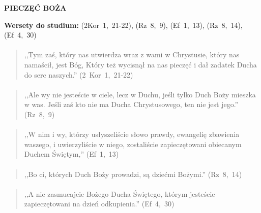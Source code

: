 \documentclass[10pt,a4paper,oneside]{article}
\begin{document}
\centerline{\textbf{\MakeUppercase{Pieczęć Boża}}}
\begin{center}
\textbf{Wersety do studium:} 
\mbox{(2Kor 1, 21-22)}, \mbox{(Rz 8, 9)}, \mbox{(Ef 1, 13)}, \mbox{(Rz 8, 14)}, \mbox{(Ef 4, 30)}
\end{center}
\paragraph{}
\begin{quote}
,,Tym zaś, który nas utwierdza wraz z wami w Chrystusie, który nas namaścił, jest Bóg, Który też wycisnął na nas pieczęć i dał zadatek Ducha do serc naszych.'' \mbox{(2 Kor 1, 21-22)}
\end{quote}
\paragraph{}
\begin{quote}
,,Ale wy nie jesteście w ciele, lecz w Duchu, jeśli tylko Duch Boży mieszka w was. Jeśli zaś kto nie ma Ducha Chrystusowego, ten nie jest jego.'' \mbox{(Rz 8, 9)}
\end{quote}
\paragraph{}
\begin{quote}
,,W nim i wy, którzy usłyszeliście słowo prawdy, ewangelię zbawienia waszego, i uwierzyliście w niego, zostaliście zapieczętowani obiecanym Duchem Świętym,'' \mbox{(Ef 1, 13)}
\end{quote}
\paragraph{}
\begin{quote}
,,Bo ci, których Duch Boży prowadzi, są dziećmi Bożymi.'' \mbox{(Rz 8, 14)}
\end{quote}
\paragraph{}
\begin{quote}
,,A nie zasmucajcie Bożego Ducha Świętego, którym jesteście zapieczętowani na dzień odkupienia.'' \mbox{(Ef 4, 30)}
\end{quote}
\end{document}
